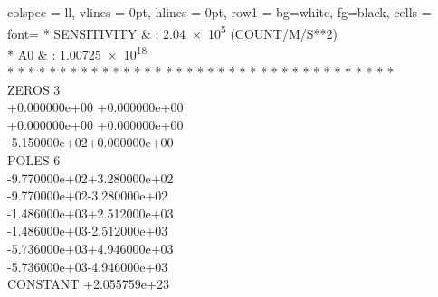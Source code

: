 \begin{longtblr}{
		colspec = {ll},
		vlines  = 0pt,
		hlines  = 0pt,
		row{1}  = {bg=white, fg=black},
		cells = {font=\ttfamily}
	}
	* SENSITIVITY       & : \num{2.04e5} (COUNT/M/S**2) \\
	* A0                & : \num{1.00725e18} \\
	 * * * * * * * * * * * * * * * * * * * * * * * * * * * * * * * * * * * * \\
	 ZEROS 3 \\
	 \hspace{1cm}+0.000000e+00 +0.000000e+00 \\
	 \hspace{1cm}+0.000000e+00 +0.000000e+00 \\
	 \hspace{1cm}-5.150000e+02+0.000000e+00 \\
	 POLES 6 \\
	 \hspace{1cm}-9.770000e+02+3.280000e+02 \\
	 \hspace{1cm}-9.770000e+02-3.280000e+02 \\
	 \hspace{1cm}-1.486000e+03+2.512000e+03 \\
	 \hspace{1cm}-1.486000e+03-2.512000e+03 \\
	 \hspace{1cm}-5.736000e+03+4.946000e+03 \\
	 \hspace{1cm}-5.736000e+03-4.946000e+03 \\
	 CONSTANT +2.055759e+23 \\
\end{longtblr}
